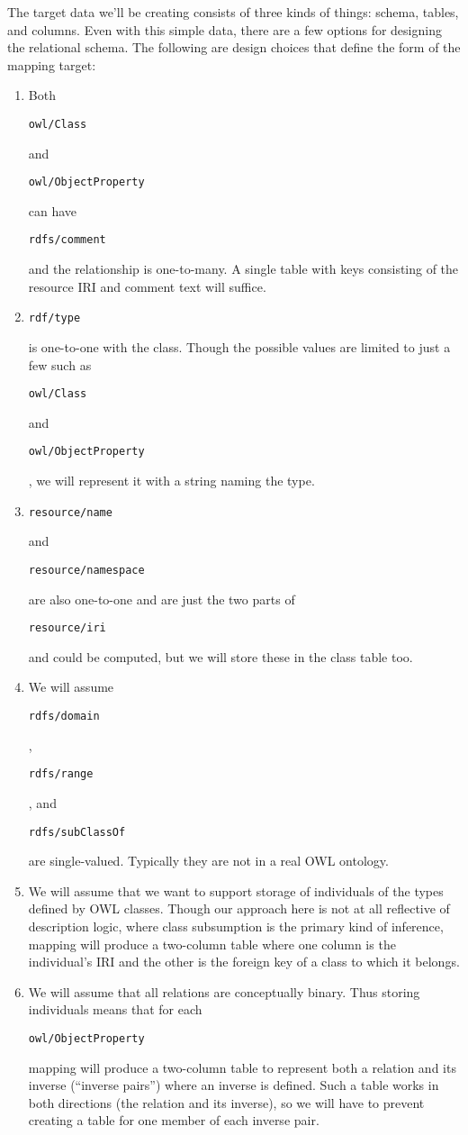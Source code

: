 \documentclass[9pt,letterpaper]{article}
\newcommand{\stt}[1]{\begin{footnotesize}\texttt{#1}\end{footnotesize}}
\begin{document}
The target data we'll be creating consists of three kinds of things: schema, tables, and columns.
Even with this simple data, there are a few options for designing the relational schema.
The following are design choices that define the form of the mapping target:
\begin{enumerate}
\item Both \stt{owl/Class} and \stt{owl/ObjectProperty} can have \stt{rdfs/comment} and the relationship is one-to-many.
  A single table with keys consisting of the resource IRI and comment text will suffice.

\item \stt{rdf/type} is one-to-one with the class. Though the possible values are limited to just a few such as \stt{owl/Class} and
  \stt{owl/ObjectProperty}, we will represent it with a string naming the type.

\item \stt{resource/name} and \stt{resource/namespace} are also one-to-one and are just the two parts of \stt{resource/iri} and could be computed, but we will store these in the class table too.

\item We will assume \stt{rdfs/domain},  \stt{rdfs/range}, and \stt{rdfs/subClassOf} are single-valued. Typically they are not in a real OWL ontology.

\item We will assume that we want to support storage of individuals of the types defined by OWL classes.
  Though our approach here is not at all reflective of description logic, where class subsumption is the primary kind of inference,
  mapping will produce a two-column table where one column is the individual's IRI and the other is the foreign key of a class to which it belongs.

\item We will assume that all relations are conceptually binary.
  Thus storing individuals means that for each \stt{owl/ObjectProperty} mapping will produce a two-column table to represent both a relation and its inverse (``inverse pairs'') where an inverse is defined.
  Such a table works in both directions (the relation and its inverse), so we will have to prevent creating a table for one member of each inverse pair.

\end{enumerate}
\end{document}
